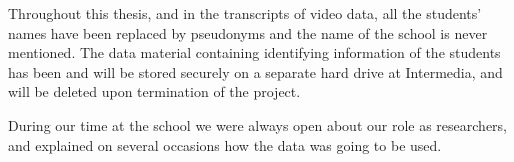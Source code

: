 Throughout this thesis, and in the transcripts of video data, all the students' names have been replaced by pseudonyms and the name of the school is never mentioned. The data material containing identifying information of the students has been and will be stored securely on a separate hard drive at Intermedia, and will be deleted  upon termination of the project. 

During our time at the school we were always open about our role as researchers, and explained on several occasions how the data was going to be used. 

